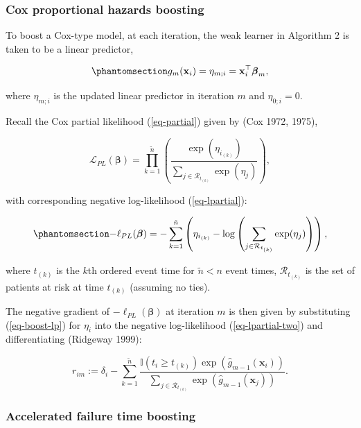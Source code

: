\documentclass[
  letterpaper,
  krantz2]{style/krantz}
\begin{document}
\subsubsection{Cox proportional hazards
boosting}\label{cox-proportional-hazards-boosting}

To boost a Cox-type model, at each iteration, the weak learner in
Algorithm 2 is taken to be a linear predictor,

\begin{equation}\phantomsection\label{eq-boost-lp}{
g_m(\mathbf{x}_i) = \eta_{m;i} = \mathbf{x}_i^\top\boldsymbol{\beta}_m,
}\end{equation}

where \(\eta_{m;i}\) is the updated linear predictor in iteration \(m\)
and \(\eta_{0;i} = 0\).

Recall the Cox partial likelihood (\ref{eq-partial}) given by (Cox 1972,
1975),

\[
\mathcal{L}_{PL}(\boldsymbol{\beta}) = \prod_{k=1}^{\tilde{n}} \left(\frac{\exp(\eta_{i_{(k)}})}{\sum_{j \in \mathcal{R}_{t_{(k)}}} \exp(\eta_j)}\right),
\]

with corresponding negative log-likelihood (\ref{eq-lpartial}):

\begin{equation}\phantomsection\label{eq-lpartial-two}{
-\ell_{PL}(\boldsymbol{\beta}) = -\sum_{k=1}^{\tilde{n}} \left(\eta_{i_{(k)}} - \log \left(\sum_{j \in \mathcal{R}_{t_{(k)}}} \exp(\eta_j)\right)\right),
}\end{equation}

where \(t_{(k)}\) is the \(k\)th ordered event time for
\(\tilde{n} < n\) event times, \(\mathcal{R}_{t_{(k)}}\) is the set of
patients at risk at time \(t_{(k)}\) (assuming no ties).

The negative gradient of \(-\ell_{PL}(\boldsymbol{\beta})\) at iteration
\(m\) is then given by substituting (\ref{eq-boost-lp}) for \(\eta_i\)
into the negative log-likelihood (\ref{eq-lpartial-two}) and
differentiating (Ridgeway 1999):

\[
r_{im} := \delta_i - \sum^{\tilde{n}}_{k=1} \frac{\mathbb{I}(t_i \geq t_{(k)}) \exp(\hat{g}_{m-1}(\mathbf{x}_i))}{\sum_{j \in \mathcal{R}_{t_{(k)}}} \exp(\hat{g}_{m-1}(\mathbf{x}_j))}.
\]

\subsubsection{Accelerated failure time
boosting}\label{accelerated-failure-time-boosting}
\end{document}
